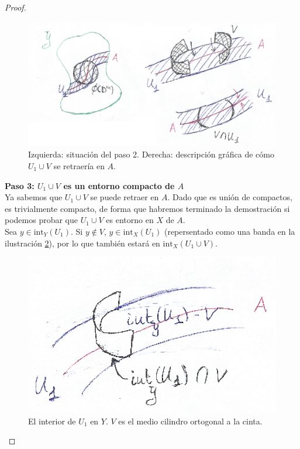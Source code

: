 \begin{proof}
\begin{figure}[h]
\centering
\includegraphics[scale=0.75]{Figures/ECompacto1}
\caption{\label{ECompacto1} Izquierda: situación del paso 2. Derecha: descripción gráfica de cómo $U_1\cup V$ se retraería en $A$.}
\end{figure}

\noindent\textbf{Paso 3: $U_1\cup V$ es un entorno compacto de $A$}
\\
Ya sabemos que $U_1 \cup V$ se puede retraer en $A$. Dado que es unión de compactos, es trivialmente compacto, de forma que habremos terminado la demostración si podemos probar que $U_1 \cup V$ es entorno en $X$ de $A$.
\\

Sea $y \in \mbox{int}_Y(U_1)$. Si $y \not\in V$, $y \in \mbox{int}_X(U_1)$ (repersentado como una banda en la ilustración \ref{ECompacto2}), por lo que también estará en $\mbox{int}_X(U_1 \cup V)$.
\\

\begin{figure}[h]
\centering
\includegraphics[scale=1]{Figures/ECompacto2}
\caption{\label{ECompacto2} El interior de $U_1$ en $Y$. $V$ es el medio cilindro ortogonal a la cinta.}
\end{figure}


\end{proof}
